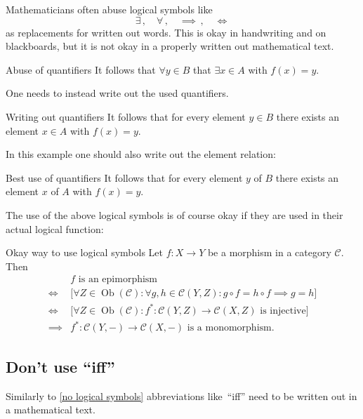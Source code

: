 Mathematicians often abuse logical symbols like
\[
  \exists \,,
  \quad
  \forall \,,
  \quad
  \implies \,,
  \quad
  \iff
\]
as replacements for written out words.
This is okay in handwriting and on blackboards, but it is not okay in a properly written out mathematical text.
\begin{showlatex}{Abuse of quantifiers}
It follows that $\forall y \in B$ that $\exists x \in A$ with $f(x) = y$.
\end{showlatex}
One needs to instead write out the used quantifiers.
\begin{showlatex}{Writing out quantifiers}
It follows that for every element $y \in B$ there exists an element $x \in A$ with $f(x) = y$.
\end{showlatex}
In this example one should also write out the element relation:
\begin{showlatex}{Best use of quantifiers}
It follows that for every element $y$ of $B$ there exists an element $x$ of $A$ with $f(x) = y$.
\end{showlatex}

The use of the above logical symbols is of course okay if they are used in their actual logical function:
\begin{showlatex}{Okay way to use logical symbols}
  Let $f \colon X \to Y$ be a morphism in a category $\mathcal{C}$.
  Then
  \begin{align*}
    {}&
      \text{$f$ is an epimorphism}
    \\
    \iff{}&
    \bigl[
    \forall Z \in \operatorname{Ob}(\mathcal{C}):
    \forall g, h \in \mathcal{C}(Y,Z):
    g \circ f = h \circ f \implies g = h
    \bigr]
    \\
    \iff{}&
    \bigl[
    \forall Z \in \operatorname{Ob}(\mathcal{C}):
    \text{$f^* \colon \mathcal{C}(Y,Z) \to \mathcal{C}(X,Z)$ is injective}
    \bigr]
    \\
    \implies{}&
    \text{$f^* \colon \mathcal{C}(Y,-) \to \mathcal{C}(X,-)$ is a monomorphism}.
  \end{align*}
\end{showlatex}



\subsection{Don’t use \enquote{iff}}
\label{no iff}

Similarly to \cref{no logical symbols} abbreviations like~\enquote{iff} need to be written out in a mathematical text.




